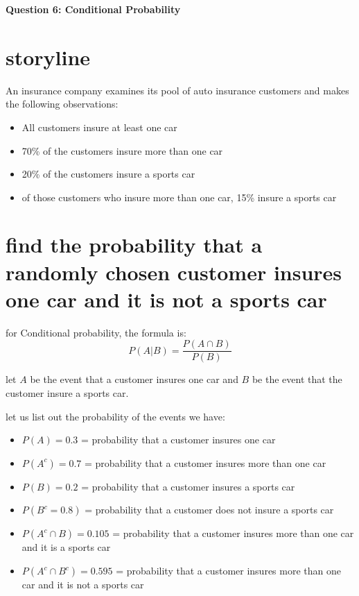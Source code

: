 \documentclass{article}
\begin{document}
\begin{center}
    \large \textbf{Question 6: Conditional Probability}
\end{center}
\section{storyline}
An insurance company examines its pool of auto insurance customers and makes the following observations:
\begin{itemize}
    \item All customers insure at least one car
    \item 70\% of the customers insure more than one car
    \item 20\% of the customers insure a sports car
    \item of those customers who insure more than one car, 15\% insure a sports car
\end{itemize}

\section{find the probability that a randomly chosen customer insures one car and it is not a sports car}

for Conditional probability, the formula is:
\[P(A|B) = \frac{P(A \cap B)}{P(B)}\]

let \(A\) be the event that a customer insures one car and \(B\) be the event that the customer insure a sports car.

let us list out the probability of the events we have:

\begin{itemize}
    \item \(P(A) = 0.3\) = probability that a customer insures one car
    \item \(P(A^c) = 0.7\) = probability that a customer insures more than one car
    \item \(P(B) = 0.2\) = probability that a customer insures a sports car
    \item \(P(B^c = 0.8)\) = probability that a customer does not insure a sports car
    \item \(P(A^c \cap B) = 0.105\) = probability that a customer insures more than one car and it is a sports car
    \item \(P(A^c \cap B^c ) = 0.595\) = probability that a customer insures more than one car and it is not a sports car
\end{itemize}
\end{document}
